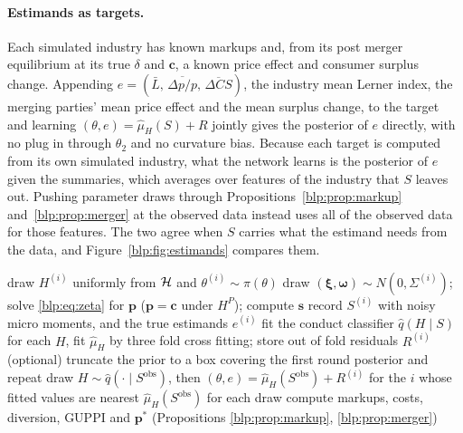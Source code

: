\paragraph{Estimands as targets.} Each simulated industry has known markups and, from its post merger equilibrium at its true $\delta$ and $\bm c$, a known price effect and consumer surplus change. Appending
$e = (\bar L,\, \overline{\Delta p/p},\, \overline{\Delta CS})$, the industry mean Lerner index, the
merging parties' mean price effect and the mean surplus change, to the target and
learning $(\theta, e) = \hat\mu_H(S) + R$ jointly gives the posterior of $e$ directly, with no plug
in through $\theta_2$ and no curvature bias. Because each target is computed from its own simulated industry, what the network learns is the posterior of $e$ given the summaries, which averages over features of the industry that $S$ leaves out. Pushing parameter draws through Propositions~\ref{blp:prop:markup} and~\ref{blp:prop:merger} at the observed data instead uses all of the observed data for those features. The two agree when $S$ carries what the estimand needs from the data, and Figure~\ref{blp:fig:estimands} compares them.

\begin{algorithm}[htbp]
\caption{GBC for BLP with conduct}\label{blp:alg:gbc}
\begin{algorithmic}[1]
 
  \State draw $H^{(i)}$ uniformly from $\mathcal{H}$ and $\theta^{(i)}\sim\pi(\theta)$
  \State draw $(\bm\xi,\bm\omega)\sim N(0,\Sigma^{(i)})$; solve \eqref{blp:eq:zeta} for $\bm p$ ($\bm p = \bm c$ under $H^P$); compute $\bm s$
  \State record $S^{(i)}$ with noisy micro moments, and the true estimands $e^{(i)}$
\EndFor
\State fit the conduct classifier $\hat q(H\mid S)$
\State for each $H$, fit $\hat\mu_H$ by three fold cross fitting; store out of fold residuals $R^{(i)}$
\State (optional) truncate the prior to a box covering the first round posterior and repeat
\State draw $H\sim\hat q(\cdot\mid S^{\mathrm{obs}})$, then $(\theta,e) = \hat\mu_H(S^{\mathrm{obs}}) + R^{(i)}$ for the $i$ whose fitted values are nearest $\hat\mu_H(S^{\mathrm{obs}})$
\State for each draw compute markups, costs, diversion, GUPPI and $\bm p^\ast$ (Propositions \ref{blp:prop:markup}, \ref{blp:prop:merger})
\end{algorithmic}
\end{algorithm}

